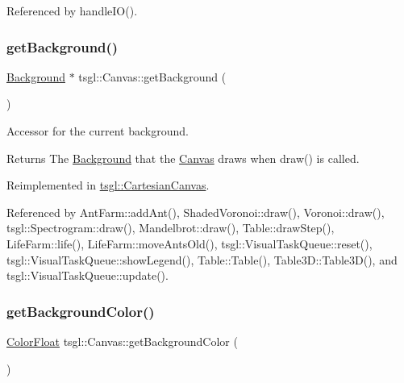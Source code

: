 Referenced by handle\+I\+O().

\mbox{\label{classtsgl_1_1_canvas_a905c38881402fe1d53cab427b93aab2f}} 
\subsubsection{\texorpdfstring{get\+Background()}{getBackground()}}
{\footnotesize\ttfamily \hyperlink{classtsgl_1_1_background}{Background} $\ast$ tsgl\+::\+Canvas\+::get\+Background (\begin{DoxyParamCaption}{ }\end{DoxyParamCaption})\hspace{0.3cm}{\ttfamily [virtual]}}



Accessor for the current background. 

\begin{DoxyReturn}{Returns}
The \hyperlink{classtsgl_1_1_background}{Background} that the \hyperlink{classtsgl_1_1_canvas}{Canvas} draws when draw() is called. 
\end{DoxyReturn}


Reimplemented in \hyperlink{classtsgl_1_1_cartesian_canvas_ad0833d6659071cae7c2ec80d784b1a67}{tsgl\+::\+Cartesian\+Canvas}.



Referenced by Ant\+Farm\+::add\+Ant(), Shaded\+Voronoi\+::draw(), Voronoi\+::draw(), tsgl\+::\+Spectrogram\+::draw(), Mandelbrot\+::draw(), Table\+::draw\+Step(), Life\+Farm\+::life(), Life\+Farm\+::move\+Ants\+Old(), tsgl\+::\+Visual\+Task\+Queue\+::reset(), tsgl\+::\+Visual\+Task\+Queue\+::show\+Legend(), Table\+::\+Table(), Table3\+D\+::\+Table3\+D(), and tsgl\+::\+Visual\+Task\+Queue\+::update().

\mbox{\label{classtsgl_1_1_canvas_a2b39e50888d61e88527a66ac0f6ac880}} 
\subsubsection{\texorpdfstring{get\+Background\+Color()}{getBackgroundColor()}}
{\footnotesize\ttfamily \hyperlink{structtsgl_1_1_color_float}{Color\+Float} tsgl\+::\+Canvas\+::get\+Background\+Color (\begin{DoxyParamCaption}{ }\end{DoxyParamCaption})}



